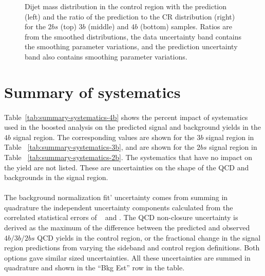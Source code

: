 \begin{figure}[htb!]
\begin{center}
\caption{Dijet mass distribution in the control region with the prediction (left) and the ratio of the prediction to the CR distribution (right) for the $2bs$ (top) $3b$ (middle) and $4b$ (bottom) samples.  Ratios are from the smoothed distributions, the data uncertainty band contains the smoothing parameter variations, and the prediction uncertainty band also contains smoothing parameter variations.}
\label{fig:qcd_shape_fit}
\end{center}
\end{figure}



\section{Summary of systematics}
\label{sec:boosted-systematics-numbers}

\paragraph{}
Table~\ref{tab:summary-systematics-4b} shows the percent impact of systematics used in the boosted analysis on the predicted signal and background yields in the $4b$ signal region.
The corresponding values are shown for the $3b$ signal region in Table ~\ref{tab:summary-systematics-3b}, and are shown for the $2bs$ signal region in Table ~\ref{tab:summary-systematics-2b}.
The systematics that have no impact on the yield are not listed. 
These are uncertainties on the shape of the QCD and \ttbar~ backgrounds in the signal region.

\paragraph{}
The background normalization fit' uncertainty comes from summing in quadrature the independent uncertainty components calculated from the correlated statistical errors of \muqcd~ and \alphatt. 
The QCD non-closure uncertainty is derived as the maximum of the difference between the predicted and observed $4b/3b/2bs$ QCD yields in the control region, or the fractional change in the signal region predictions from varying the sideband and control region definitions.
Both options gave similar sized uncertainties. 
All these uncertainties are summed in quadrature and shown in the ``Bkg Est'' row in the table.

